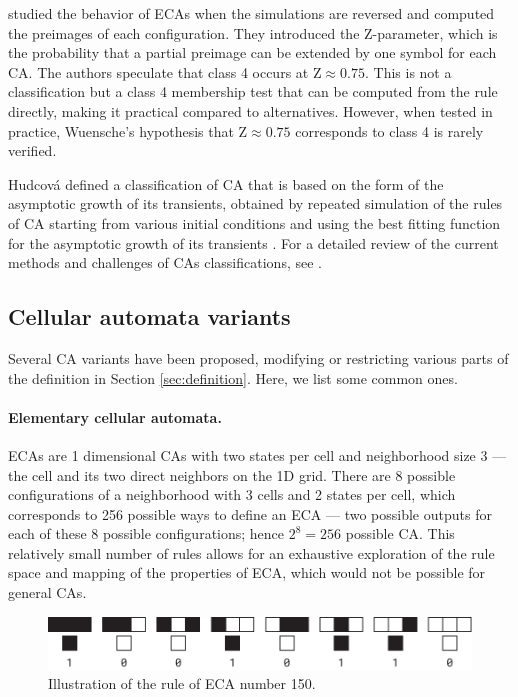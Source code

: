\textcite{wuenscheGlobalDynamicsCellular1992} studied the behavior of \acp{ECA}
when the simulations are reversed and computed the preimages of each
configuration. They introduced the Z-parameter, which is the probability that a
partial preimage can be extended by one symbol for each \ac{CA}. The authors speculate
that class 4 occurs at $\text{Z} \approx 0.75$. This is not a classification but a
class 4 membership test that can be computed from the rule directly, making it
practical compared to alternatives. However, when tested in practice, Wuensche's
hypothesis that $\text{Z} \approx 0.75$ corresponds to class 4 is rarely verified.

Hudcová defined a classification of \ac{CA} that is based on the form of the
asymptotic growth of its transients, obtained by repeated simulation of the
rules of \ac{CA} starting from various initial conditions and using the best
fitting function for the asymptotic growth of its transients
\parencite{hudcovaClassificationComplexSystems2020,
  hudcovaClassificationDiscreteDynamical2022}. For a 
detailed review of the current methods and challenges of \acp{CA} classifications, see
\autocite{vispoelProgressGapsObstacles2022}.

\subsection{Cellular automata variants}

Several \ac{CA} variants have been proposed, modifying or
restricting various parts of the definition in Section \ref{sec:definition}.
Here, we list some common ones.

\paragraph{Elementary cellular automata.\label{sec:elem-cell-autom}}
\Acp{ECA} are 1 dimensional \acp{CA} with two states per cell and
neighborhood size 3 --- the cell and its two direct neighbors on the 1D grid.
There are 8 possible configurations of a neighborhood with 3 cells and 2 states
per cell, which corresponds to 256 possible ways to define an \ac{ECA} --- two
possible outputs for each of these 8 possible configurations; hence
$2^{8} = 256$ possible \ac{CA}. This relatively small number of rules allows for an
exhaustive exploration of the rule space and mapping of the properties of \ac{ECA},
which would not be possible for general \acp{CA}.

\begin{figure}[htbp]
  \centering
  \includegraphics[width=.95\linewidth]{figures/eca_150_rule}
  \caption{Illustration of the rule of \ac{ECA} number 150.}
  \label{fig:eca_150_rule}
\end{figure}

